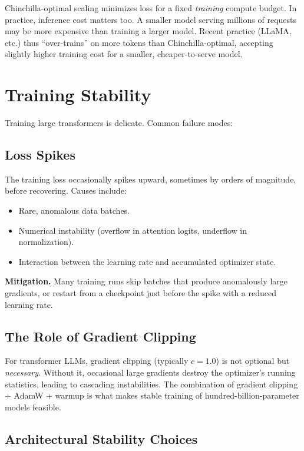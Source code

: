 \documentclass[main.tex]{subfiles}
\begin{document}
\begin{remark}
Chinchilla-optimal scaling minimizes loss for a fixed \textit{training} compute budget. In practice, inference cost matters too. A smaller model serving millions of requests may be more expensive than training a larger model. Recent practice (LLaMA, etc.) thus ``over-trains'' on more tokens than Chinchilla-optimal, accepting slightly higher training cost for a smaller, cheaper-to-serve model.
\end{remark}

\needspace{0.33\textheight}
\section{Training Stability}

Training large transformers is delicate. Common failure modes:

\subsection{Loss Spikes}

The training loss occasionally spikes upward, sometimes by orders of magnitude, before recovering. Causes include:
\begin{itemize}
    \item Rare, anomalous data batches.
    \item Numerical instability (overflow in attention logits, underflow in normalization).
    \item Interaction between the learning rate and accumulated optimizer state.
\end{itemize}

\textbf{Mitigation.} Many training runs skip batches that produce anomalously large gradients, or restart from a checkpoint just before the spike with a reduced learning rate.

\subsection{The Role of Gradient Clipping}

For transformer LLMs, gradient clipping (typically $c = 1.0$) is not optional but \textit{necessary}. Without it, occasional large gradients destroy the optimizer's running statistics, leading to cascading instabilities. The combination of gradient clipping + AdamW + warmup is what makes stable training of hundred-billion-parameter models feasible.

\subsection{Architectural Stability Choices}
\end{document}
